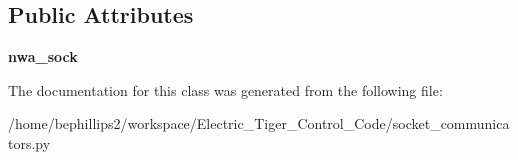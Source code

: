 \subsection*{Public Attributes}
\begin{DoxyCompactItemize}
\item 
\hypertarget{classsocket__communicators_1_1_network_analyzer_comm_a49e827e1462940614fef5cd5f3434bed}{{\bfseries nwa\-\_\-sock}}\label{classsocket__communicators_1_1_network_analyzer_comm_a49e827e1462940614fef5cd5f3434bed}

\end{DoxyCompactItemize}


The documentation for this class was generated from the following file\-:\begin{DoxyCompactItemize}
\item 
/home/bephillips2/workspace/\-Electric\-\_\-\-Tiger\-\_\-\-Control\-\_\-\-Code/socket\-\_\-communicators.\-py\end{DoxyCompactItemize}
